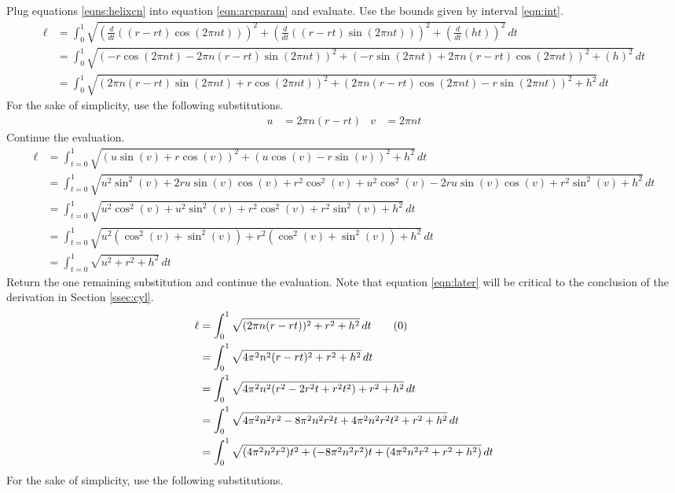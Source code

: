 \documentclass{article}
\begin{document}
\bigskip
Plug equations \ref{eqns:helixcn} into equation \ref{eqn:arcparam} and evaluate. Use the bounds given by interval \ref{eqn:int}.
\begin{align*}
    \ell &= \int_0^1\sqrt{\left(\frac{d}{dt}((r-rt)\cos(2\pi nt))\right)^2+\left(\frac{d}{dt}((r-rt)\sin(2\pi nt))\right)^2+\left(\frac{d}{dt}(ht)\right)^2}\, dt\\
    &= \int_0^1\sqrt{(-r\cos(2\pi nt)-2\pi n(r-rt)\sin(2\pi nt))^2+(-r\sin(2\pi nt)+2\pi n(r-rt)\cos(2\pi nt))^2+(h)^2}\, dt\\
    &= \int_0^1\sqrt{(2\pi n(r-rt)\sin(2\pi nt)+r\cos(2\pi nt))^2+(2\pi n(r-rt)\cos(2\pi nt)-r\sin(2\pi nt))^2+h^2}\, dt
\end{align*}
For the sake of simplicity, use the following substitutions.
\begin{align*}
    u &= 2\pi n(r-rt)&
    v &= 2\pi nt
\end{align*}
Continue the evaluation.
\begin{align*}
    \ell &= \int_{t=0}^1\sqrt{(u\sin(v)+r\cos(v))^2+(u\cos(v)-r\sin(v))^2+h^2}\, dt\\
    &= \int_{t=0}^1\sqrt{u^2\sin^2(v)+2ru\sin(v)\cos(v)+r^2\cos^2(v)+u^2\cos^2(v)-2ru\sin(v)\cos(v)+r^2\sin^2(v)+h^2}\, dt\\
    &= \int_{t=0}^1\sqrt{u^2\cos^2(v)+u^2\sin^2(v)+r^2\cos^2(v)+r^2\sin^2(v)+h^2}\, dt\\
    &= \int_{t=0}^1\sqrt{u^2\left(\cos^2(v)+\sin^2(v)\right)+r^2\left(\cos^2(v)+\sin^2(v)\right)+h^2}\, dt\\
    &= \int_{t=0}^1\sqrt{u^2+r^2+h^2}\, dt
\end{align*}
Return the one remaining substitution and continue the evaluation. Note that equation \ref{eqn:later} will be critical to the conclusion of the derivation in Section \ref{ssec:cyl}.
\begin{align*}
    \ell &= \int_0^1\sqrt{(2\pi n(r-rt))^2+r^2+h^2}\, dt\tag{\theequation}\label{eqn:later}
    \stepcounter{equation}\\
    &= \int_0^1\sqrt{4\pi^2n^2(r-rt)^2+r^2+h^2}\, dt\\
    &= \int_0^1\sqrt{4\pi^2n^2(r^2-2r^2t+r^2t^2)+r^2+h^2}\, dt\\
    &= \int_0^1\sqrt{4\pi^2n^2r^2-8\pi^2n^2r^2t+4\pi^2n^2r^2t^2+r^2+h^2}\, dt\\
    &= \int_0^1\sqrt{(4\pi^2n^2r^2)t^2+(-8\pi^2n^2r^2)t+(4\pi^2n^2r^2+r^2+h^2)}\, dt
\end{align*}
For the sake of simplicity, use the following substitutions.
\end{document}
